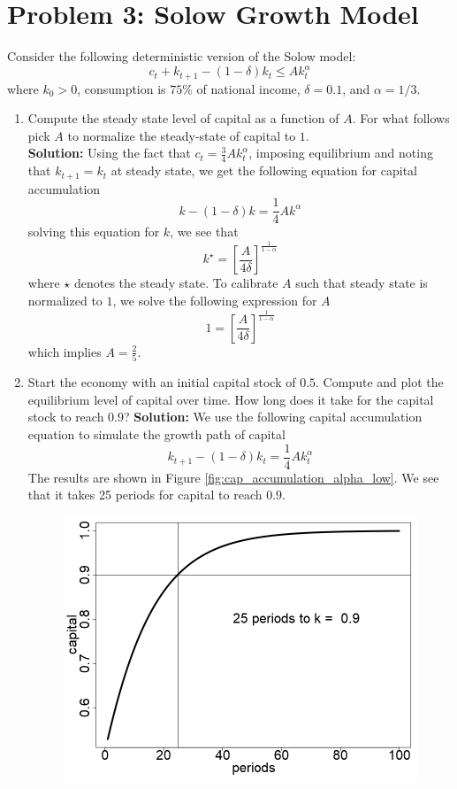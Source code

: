 \documentclass[10pt,letter]{article}
\begin{document}
\section*{Problem 3: Solow Growth Model}
Consider the following deterministic version of the Solow model:
\begin{equation*}
	c_t + k_{t+1} - (1-\delta)k_t \leq Ak_t^{\alpha}
\end{equation*}
where $k_0 > 0$, consumption is $75\%$ of national income, $\delta = 0.1$, and $\alpha = 1/3$. 
\begin{enumerate}
	\item Compute the steady state level of capital as a function of $A$. For what follows pick $A$ to normalize the steady-state of capital to $1$. \\
	
	\noindent\textbf{Solution:}
	Using the fact that $c_t = \frac{3}{4}Ak_t^\alpha$, imposing equilibrium and noting that $k_{t+1} = k_t$ at steady state, we get the following equation for capital accumulation
	\begin{equation*}
		k - (1-\delta)k = \frac{1}{4}Ak^\alpha
	\end{equation*}
	solving this equation for $k$, we see that 
	\begin{equation*}
		k^\star = \left[\frac{A}{4\delta}\right]^{\frac{1}{1-\alpha}}
	\end{equation*}
	where $\star$ denotes the steady state. To calibrate $A$ such that steady state is normalized to $1$, we solve the following expression for $A$
	\begin{equation}
		1 = \left[\frac{A}{4\delta}\right]^{\frac{1}{1-\alpha}}
		\label{eq:A_calibration}
	\end{equation}
	which implies $A = \frac{2}{5}$. 
	\item Start the economy with an initial capital stock of $0.5$. Compute and plot the equilibrium level of capital over time. How long does it take for the capital stock to reach 0.9?
    \noindent\textbf{Solution:} We use the following capital accumulation equation to simulate the growth path of capital 
    \begin{equation}
    	k_{t+1} -(1-\delta)k_t = \frac{1}{4}Ak_t^\alpha
    	\label{eq:capital_accumulation}
    \end{equation}
    The results are shown in Figure \ref{fig:cap_accumulation_alpha_low}. We see that it takes 25 periods for capital to reach $0.9$. 
    \begin{figure}[!htb]
    	\centering
    	\includegraphics[width=0.5\linewidth]{solow_growth_alpha_low.png}

\end{figure}
\end{enumerate}
\end{document}
